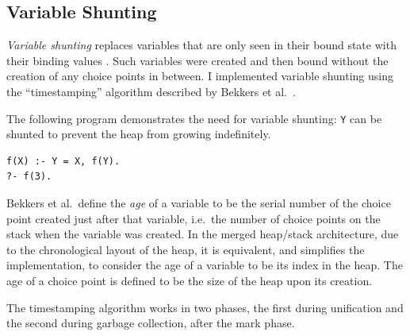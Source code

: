 \subsection{Variable Shunting}

\label{sec:variable-shunting}

\emph{Variable shunting} replaces variables that are only seen in their bound state with their binding values \cite{sahlinVariableShuntingWAM1991}. Such variables were created and then bound without the creation of any choice points in between. I implemented variable shunting using the ``timestamping'' algorithm described by Bekkers et al.\ \cite{bekkersDynamicMemoryManagement1992}.

The following program demonstrates the need for variable shunting: \texttt{Y} can be shunted to prevent the heap from growing indefinitely.

\begin{center}
\begin{verbatim}
f(X) :- Y = X, f(Y).
?- f(3).
\end{verbatim}
\end{center}

Bekkers et al.\ define the \emph{age} of a variable to be the serial number of the choice point created just after that variable, i.e.\ the number of choice points on the stack when the variable was created. In the merged heap/stack architecture, due to the chronological layout of the heap, it is equivalent, and simplifies the implementation, to consider the age of a variable to be its index in the heap. The age of a choice point is defined to be the size of the heap upon its creation.

The timestamping algorithm works in two phases, the first during unification and the second during garbage collection, after the mark phase.


